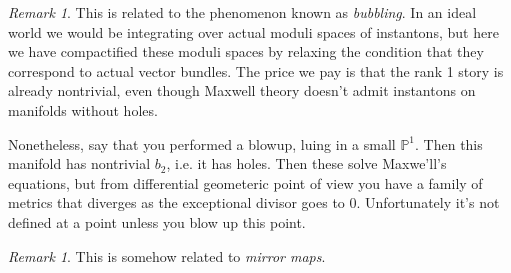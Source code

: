 \documentclass[leqno, openany]{memoir}
\theoremstyle{definition}
\theoremstyle{remark}
\newtheorem{rmk}[thm]{Remark}
\theoremstyle{plain}
\theoremstyle{definition}
\theoremstyle{remark}
\begin{document}
\begin{rmk}
  This is related to the phenomenon known as \emph{bubbling}. In an ideal world we would be integrating over actual moduli spaces of instantons, but 
  here we have compactified these moduli spaces by relaxing the condition that they correspond to actual vector bundles.
  The price we pay is that the rank 1 story is already nontrivial, even though Maxwell theory doesn't admit instantons on manifolds without holes. 

  Nonetheless, say that you performed a blowup, luing in a small $\mathbb{P}^1$. Then this manifold has nontrivial $b_2$, i.e. it has holes. 
  Then these solve Maxwe'll's equations, but from differential geometeric point of view you have a family of metrics that diverges as the exceptional divisor goes to 0. 
  Unfortunately it's not defined at a point unless you blow up this point.
\end{rmk}

\begin{rmk}
This is somehow related to \emph{mirror maps}. 
\end{rmk}
\end{document}
